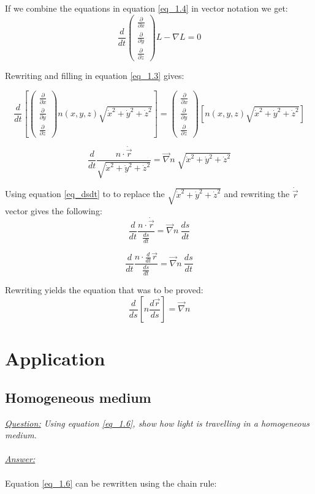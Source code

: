 \documentclass{article}
\def\Nabla{
	\begin{pmatrix}
		\frac{\partial}{\partial {x}} \\
		\frac{\partial}{\partial {y}} \\
		\frac{\partial}{\partial {z}}
	\end{pmatrix}}
\def\dNabla{
	\begin{pmatrix}
		\frac{\partial}{\partial \dot{x}} \\
		\frac{\partial}{\partial \dot{y}} \\
		\frac{\partial}{\partial \dot{z}}
	\end{pmatrix}}
\begin{document}
If we combine the equations in equation \ref{eq_1.4} in vector notation we get: \\

\begin{equation}
	\frac{d}{dt} \dNabla L - \nabla L = 0
\end{equation}

Rewriting and filling in equation \ref{eq_1.3} gives:

\begin{equation}
	\frac{d}{dt} \left[ \dNabla n(x,y,z)\sqrt{\dot{x}^2+\dot{y}^2+\dot{z}^2} \right] = \Nabla \left[ n(x,y,z)\sqrt{\dot{x}^2+\dot{y}^2+\dot{z}^2} \right]
\end{equation}

\begin{equation}
	\frac{d}{dt}  \frac{n \cdot \dot{\vec{r}} }{\sqrt{\dot{x}^2+\dot{y}^2+\dot{z}^2}}   = \vec{\nabla} n \; \sqrt{\dot{x}^2+\dot{y}^2+\dot{z}^2}
\end{equation}

Using equation \ref{eq_dsdt} to to replace the $\sqrt{\dot{x}^2+\dot{y}^2+\dot{z}^2}$ and rewriting the $\dot{\vec{r}}$ vector gives the following: \\

\begin{equation}
	\frac{d}{dt} \frac{n \cdot \dot{\vec{r}}}{\frac{ds}{dt}}  = \vec{\nabla} n \: \frac{ds}{dt}
\end{equation}

\begin{equation}
	\frac{d}{dt}  \frac{n \cdot \frac{d}{dt} \vec{r}}{\frac{ds}{dt}}   =  \vec{\nabla} n \: \frac{ds}{dt}
\end{equation}

Rewriting yields the equation that was to be proved: \\

\begin{equation}
	\frac{d}{ds} \left[ n \frac{d \vec{r}}{ds} \right] = \vec{\nabla} n
\end{equation}

\section{Application}
\subsection{Homogeneous medium}

\textit{\underline{Question:} Using equation \ref{eq_1.6}, show how light is travelling in a homogeneous medium.}\\
\\
\textit{\underline{Answer:}} \\
\\
Equation \ref{eq_1.6} can be rewritten using the chain rule: \\
\end{document}
